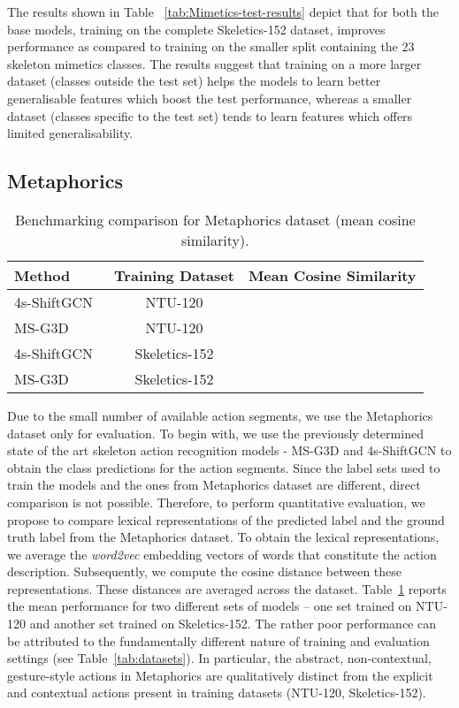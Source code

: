 \documentclass[twocolumn]{svjour3}          \smartqed  \usepackage{graphicx}
\begin{document}
The results shown in Table ~\ref{tab:Mimetics-test-results} depict that for both the base models, training on the complete Skeletics-152 dataset, improves performance as compared to training on the smaller split containing the 23 skeleton mimetics classes. The results suggest that training on a more larger dataset (classes outside the test set) helps the models to learn better generalisable features which boost the test performance, whereas a smaller dataset (classes specific to the test set) tends to learn features which offers limited generalisability. 


\subsection{Metaphorics}
\label{sec:MetaphoricsEvaluation}



\begin{table}[!t]
\resizebox{\linewidth}{!}
 {\centering
 \begin{tabular}{l|c|c}
 \toprule
             Method & Training Dataset & Mean Cosine Similarity \\
 \midrule
  4s-ShiftGCN~\cite{cheng2020shiftgcn} & NTU-120 &  \\
  MS-G3D~\cite{liu2020disentangling} & NTU-120 & \\
  4s-ShiftGCN~\cite{cheng2020shiftgcn} & Skeletics-152 &  \\
  MS-G3D~\cite{liu2020disentangling} & Skeletics-152 & \\
  \bottomrule
 \end{tabular}
  }
\caption{\label{tab:metaphorics} Benchmarking comparison for Metaphorics dataset (mean cosine similarity). }
\end{table}



Due to the small number of available action segments, we use the Metaphorics dataset only for evaluation. To begin with, we use the previously determined state of the art skeleton action recognition models - MS-G3D and 4s-ShiftGCN to obtain the class predictions for the action segments. Since the label sets used to train the models and the ones from Metaphorics dataset are different, direct comparison is not possible. Therefore, to perform quantitative evaluation, we propose to compare lexical representations of the predicted label and the ground truth label from the Metaphorics dataset. To obtain the lexical representations, we average the \textit{word2vec} embedding vectors of words that constitute the action description. Subsequently, we compute the cosine distance between these representations. These distances are averaged across the dataset. Table~\ref{tab:metaphorics} reports the mean performance for two different sets of models -- one set trained on NTU-120 and another set trained on Skeletics-152. The rather poor performance can be attributed to the fundamentally different nature of training and evaluation settings (see Table~\ref{tab:datasets}). In particular, the abstract, non-contextual, gesture-style actions in Metaphorics are qualitatively distinct from the explicit and contextual actions present in training datasets (NTU-120, Skeletics-152).
\end{document}
